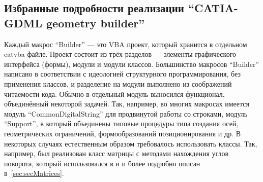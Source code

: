 
\subsection{Избранные подробности реализации ``CATIA-GDML geometry builder''}\label{sec:secImplDetails}

Каждый макрос ``Builder'' --- это VBA проект, который хранится в отдельном catvba файле. Проект состоит из трёх разделов --- элементы графического интерфейса (формы), модули и модули классов. Большинство макросов ``Builder'' написано в соответствии с идеологией структурного программирования, без применения классов, и разделение на модули выполнено из соображений читаемости кода. Обычно в отдельный модуль выносился функционал, объединённый некоторой задачей. Так, например, во многих макросах имеется модуль ``CommonDigitalString'' для продвинутой работы со строками, модуль ``Support'', в который объединены типовые процедуры типа создания осей, геометрических ограничений, формообразований позиционирования и др. В некоторых случаях естественным образом требовалось использовать классы. Так, например, был реализован класс матрицы с методами нахождения углов поворота, который использовался в  и  и более подробно описан в~\ref{sec:secMatrices}.

%                                                                    

